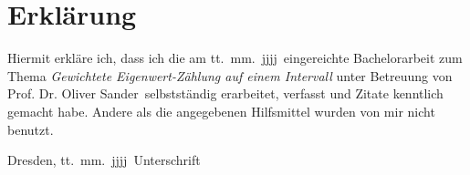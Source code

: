\documentclass[a4paper,12pt]{report}
\newcommand{\betreuer}{Prof. Dr. Oliver Sander}
\newcommand{\thema}{Gewichtete Eigenwert-Zählung auf einem Intervall}
\newcommand{\datum}{tt.\ mm.\ jjjj} %
\newcommand{\1}{\mathds{1}}
\theoremstyle{plain} %
\theoremstyle{definition} %
\theoremstyle{remark}
\begin{document}
      \printbibliography

\chapter*{Erkl\"{a}rung}
\thispagestyle{empty}
Hiermit erkl\"{a}re ich, dass ich die am \datum\ eingereichte Bachelorarbeit zum Thema
\emph{\thema} unter Betreuung von \betreuer\ selbstst\"{a}ndig erarbeitet,
verfasst und Zitate kenntlich gemacht habe. Andere als die angegebenen Hilfsmittel
wurden von mir nicht benutzt.

\bigskip \bigskip \bigskip \bigskip \bigskip

Dresden, \datum\ \hfill Unterschrift

\normalsize
\end{document}
